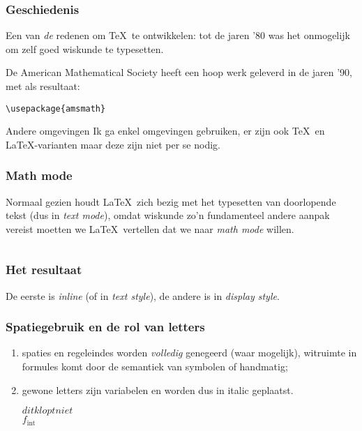 \begin{frame}[fragile]
  \frametitle{Geschiedenis}

  Een van \emph{de} redenen om \TeX\ te ontwikkelen: tot de jaren '80 was het onmogelijk om zelf goed wiskunde te typesetten.

  De American Mathematical Society heeft een hoop werk geleverd in de jaren '90, met als resultaat:
  \begin{verbatim}
\usepackage{amsmath}
  \end{verbatim}

  \begin{exampleblock}{Andere omgevingen}
    Ik ga enkel  omgevingen gebruiken, er zijn ook \TeX\ en \LaTeX-varianten maar deze zijn niet per se nodig.
  \end{exampleblock}
\end{frame}

\begin{frame}[fragile]
  \frametitle{Math mode}

  Normaal gezien houdt \LaTeX\ zich bezig met het typesetten van doorlopende tekst (dus in \emph{text mode}), omdat wiskunde zo'n fundamenteel andere aanpak vereist moetten we \LaTeX\ vertellen dat we naar \emph{math mode} willen.
  
  \inputminted{tex}{math-example.tex}
\end{frame}

\begin{frame}
  \frametitle{Het resultaat}

  

  De eerste is \emph{inline} (of in \emph{text style}), de andere is in \emph{display style}.
\end{frame}

\begin{frame}[fragile]
  \frametitle{Spatiegebruik en de rol van letters}

  \begin{enumerate}
    \item spaties en regeleindes worden \emph{volledig} genegeerd (waar mogelijk), witruimte in formules komt door de semantiek van symbolen of handmatig;
    \item gewone letters zijn variabelen en worden dus in italic geplaatst.
      \begin{LTXexample}
$dit klopt niet$ \\
$f_{\text{int}}$
      \end{LTXexample}
  \end{enumerate}
\end{frame}

